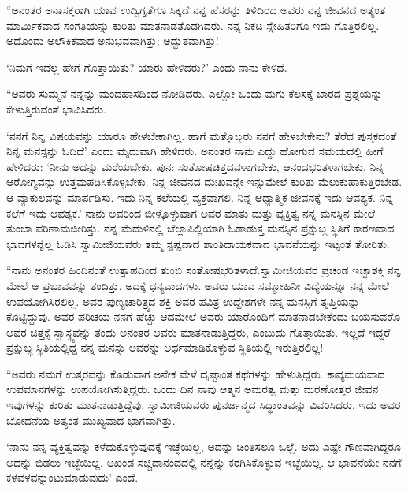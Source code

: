  “ಅನಂತರ ಅನಾಸಕ್ತರಾಗಿ ಯಾವ ಉದ್ವಿಗ್ನತೆಗೂ ಸಿಕ್ಕದೆ ನನ್ನ ಹೆಸರನ್ನು ತಿಳಿದಿರದ ಅವರು ನನ್ನ ಜೀವನದ ಅತ್ಯಂತ ಮಾರ್ಮಿಕವಾದ ಸಂಗತಿಯನ್ನು ಕುರಿತು ಮಾತನಾಡತೊಡಗಿದರು. ನನ್ನ ನಿಕಟ ಸ್ನೇಹಿತರಿಗೂ ಇದು ಗೊತ್ತಿರಲಿಲ್ಲ. ಅದೊಂದು ಅಲೌಕಿಕವಾದ ಅನುಭವವಾಗಿತ್ತು; ಅದ್ಭುತವಾಗಿತ್ತು!

\vskip 3pt

 ‘ನಿಮಗೆ ಇದೆಲ್ಲ ಹೇಗೆ ಗೊತ್ತಾಯಿತು? ಯಾರು ಹೇಳಿದರು?’ ಎಂದು ನಾನು ಕೇಳಿದೆ. 

\vskip 3pt

 “ಅವರು ಸುಮ್ಮನೆ ನನ್ನನ್ನು ಮಂದಹಾಸದಿಂದ ನೋಡಿದರು. ಎಲ್ಲೋ ಒಂದು ಮಗು ಕೆಲಸಕ್ಕೆ ಬಾರದ ಪ್ರಶ್ನೆಯನ್ನು ಕೇಳುತ್ತಿರುವಂತೆ ಭಾವಿಸಿದರು.

\vskip 3pt

 ‘ನನಗೆ ನಿನ್ನ ವಿಷಯವನ್ನು ಯಾರೂ ಹೇಳಬೇಕಾಗಿಲ್ಲ. ಹಾಗೆ ಮತ್ತೊಬ್ಬರು ನನಗೆ ಹೇಳಬೇಕೇನು? ತೆರೆದ ಪುಸ್ತಕದಂತೆ ನಿನ್ನ ಮನಸ್ಸನ್ನು ಓದಿದೆ’ ಎಂದು ಮೃದುವಾಗಿ ಹೇಳಿದರು. ಅನಂತರ ನಾನು ಎದ್ದು ಹೋಗುವ ಸಮಯದಲ್ಲಿ ಹೀಗೆ ಹೇಳಿದರು: ‘ನೀನು ಅದನ್ನು ಮರೆಯಬೇಕು. ಪುನಃ ಸಂತೋಷಚಿತ್ತದವಳಾಗಬೇಕು, ಆನಂದಭರಿತಳಾಗಬೇಕು. ನಿನ್ನ ಆರೋಗ್ಯವನ್ನು ಉತ್ತಮಪಡಿಸಿಕೊಳ್ಳಬೇಕು. ನಿನ್ನ ಜೀವನದ ದುಃಖವನ್ನೇ ಇನ್ನುಮೇಲೆ ಕುರಿತು ಮೆಲುಕುಹಾಕುತ್ತಿರಬೇಡ. ಆ ವ್ಯಾಕುಲವನ್ನು ಮಾರ್ಪಡಿಸು. ಇದು ನಿನ್ನ ಕಲೆಯಲ್ಲಿ ವ್ಯಕ್ತವಾಗಲಿ. ನಿನ್ನ ಆಧ್ಯಾತ್ಮಿಕ ಜೀವನಕ್ಕೆ ಇದು ಆವಶ್ಯಕ. ನಿನ್ನ ಕಲೆಗೆ ಇದು ಆವಶ್ಯಕ.’ ನಾನು ಅವರಿಂದ ಬೀಳ್ಕೊಳ್ಳುವಾಗ ಅವರ ಮಾತು ಮತ್ತು ವ್ಯಕ್ತಿತ್ವ ನನ್ನ ಮನಸ್ಸಿನ ಮೇಲೆ ತುಂಬಾ ಪರಿಣಾಮಬೀರಿತ್ತು. ನನ್ನ ಮೆದುಳಿನಲ್ಲಿ ಚೆಲ್ಲಾಪಿಲ್ಲಿಯಾಗಿ ಓಡಾಡುತ್ತ ಮನಸ್ಸಿನ ಪ್ರಕ್ಷುಬ್ಧ ಸ್ಥಿತಿಗೆ ಕಾರಣವಾದ ಭಾವಗಳನ್ನೆಲ್ಲ ಓಡಿಸಿ ಸ್ವಾಮೀಜಿಯವರು ತಮ್ಮ ಸ್ಪಷ್ಟವಾದ ಶಾಂತಿದಾಯಕವಾದ ಭಾವನೆಯನ್ನು ಇಟ್ಟಂತೆ ತೋರಿತು. 

\vskip 3pt

 “ನಾನು ಅನಂತರ ಹಿಂದಿನಂತೆ ಉತ್ಸಾಹದಿಂದ ತುಂಬಿ ಸಂತೋಷಭರಿತಳಾದೆ.\break ಸ್ವಾಮೀಜಿಯವರ ಪ್ರಚಂಡ ಇಚ್ಛಾಶಕ್ತಿ ನನ್ನ ಮೇಲೆ ಆ ಪ್ರಭಾವವನ್ನು ತಂದಿತ್ತು. ಅದಕ್ಕೆ ಧನ್ಯವಾದಗಳು. ಅವರು ಯಾವ ಸಮ್ಮೋಹಿನೀ ವಿದ್ಯೆಯನ್ನೂ ನನ್ನ ಮೇಲೆ ಉಪಯೋಗಿಸಿರಲಿಲ್ಲ. ಅವರ ಪುಣ್ಯಚಾರಿತ್ರ್ಯದ ಶಕ್ತಿ ಅವರ ಪವಿತ್ರ ಉದ್ದೇಶಗಳೇ ನನ್ನ ಮನಸ್ಸಿಗೆ ತೃಪ್ತಿಯನ್ನು ಕೊಟ್ಟಿದ್ದುವು. ಅವರ ಪರಿಚಯ ನನಗೆ ಹೆಚ್ಚು ಆದಮೇಲೆ ಅವರು ಯಾರೊಂದಿಗೆ ಮಾತನಾಡಬೇಕೆಂದು ಬಯಸುವರೊ ಅವರ ಚಿತ್ತಕ್ಕೆ ಸ್ವಾಸ್ಥ್ಯವನ್ನು ತಂದು ಅನಂತರ ಅವರು ಮಾತನಾಡುತ್ತಿದ್ದರು, ಎಂಬುದು ಗೊತ್ತಾಯಿತು. ಇಲ್ಲದೆ ಇದ್ದರೆ ಪ್ರಕ್ಷುಬ್ಧ ಸ್ಥಿತಿಯಲ್ಲಿದ್ದ ನನ್ನ ಮನಸ್ಸು ಅವರನ್ನು ಅರ್ಥಮಾಡಿಕೊಳ್ಳುವ ಸ್ಥಿತಿಯಲ್ಲಿ ಇರುತ್ತಿರಲಿಲ್ಲ!

“ಅವರು ನಮಗೆ ಉತ್ತರವನ್ನು ಕೊಡುವಾಗ ಅನೇಕ ವೇಳೆ ದೃಷ್ಟಾಂತ ಕಥೆಗಳನ್ನು ಹೇಳುತ್ತಿದ್ದರು. ಕಾವ್ಯಮಯವಾದ ಉಪಮಾನಗಳನ್ನು ಉಪಯೋಗಿಸುತ್ತಿದ್ದರು. ಒಂದು ದಿನ ನಾವು ಆತ್ಮನ ಅಮರತ್ವ ಮತ್ತು ಮರಣೋತ್ತರ ಜೀವನ ಇವುಗಳನ್ನು ಕುರಿತು ಮಾತನಾಡುತ್ತಿದ್ದೆವು. ಸ್ವಾಮೀಜಿಯವರು ಪುನರ್ಜನ್ಮದ ಸಿದ್ಧಾಂತವನ್ನು ವಿವರಿಸಿದರು. ಇದು ಅವರ ಬೋಧನೆಯ ಅತ್ಯಂತ ಮುಖ್ಯವಾದ ಭಾಗವಾಗಿತ್ತು.

 ‘ನಾನು ನನ್ನ ವ್ಯಕ್ತಿತ್ವವನ್ನು ಕಳೆದುಕೊಳ್ಳುವುದಕ್ಕೆ ಇಚ್ಛೆಯಿಲ್ಲ, ಅದನ್ನು ಚಿಂತಿಸಲೂ ಒಲ್ಲೆ. ಅದು ಎಷ್ಟೇ ಗೌಣವಾಗಿದ್ದರೂ ಅದನ್ನು ಬಿಡಲು ಇಚ್ಛೆಯಿಲ್ಲ. ಅಖಂಡ ಸಚ್ಚಿದಾನಂದದಲ್ಲಿ ನನ್ನನ್ನು ಕರಗಿಸಿಕೊಳ್ಳುವ ಇಚ್ಛೆಯಿಲ್ಲ. ಆ ಭಾವನೆಯೇ ನನಗೆ ಕಳವಳವನ್ನುಂಟುಮಾಡುವುದು’ ಎಂದೆ. 

